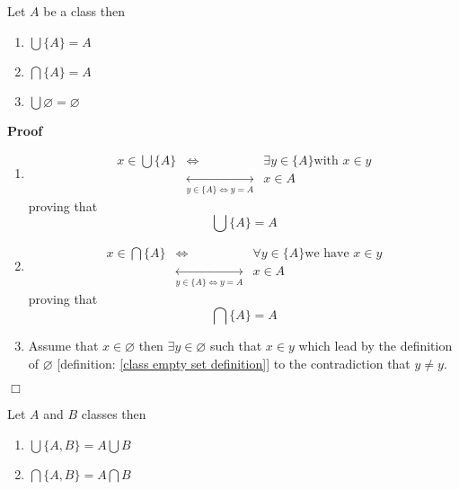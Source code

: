\documentclass{book}
\newcommand{\Leftrightarrowlim}{\mathop{\leftrightarrow}\limits}
\newenvironment{proof}{\noindent\textbf{Proof\ }}{\hspace*{\fill}$\Box$\medskip}
\begin{document}
\begin{example}
  \label{class trivial union intersection}Let $A$ be a class then
  \begin{enumerate}
    \item $\bigcup \{ A \} = A$
    
    \item $\bigcap \{ A \} = A$
    
    \item $\bigcup \varnothing = \varnothing$
  \end{enumerate}
\end{example}

\begin{proof}
  
  \begin{enumerate}
    \item 
    \begin{eqnarray*}
      x \in \bigcup \{ A \} & \Leftrightarrow & \exists y \in \{ A \} \text{
      with } x \in y\\
      & \Leftrightarrowlim_{y \in \{ A \} \Leftrightarrow y = A} & x \in A
    \end{eqnarray*}
    proving that
    \[ \bigcup \{ A \} = A \]
    \item 
    \begin{eqnarray*}
      x \in \bigcap \{ A \} & \Leftrightarrow & \forall y \in \{ A \} \text{
      we have } x \in y\\
      & \Leftrightarrowlim_{y \in \{ A \} \Leftrightarrow y = A} & x \in A
    \end{eqnarray*}
    proving that
    \[ \bigcap \{ A \} = A \]
    \item Assume that $x \in \varnothing$ then $\exists y \in \varnothing$
    such that $x \in y$ which lead by the definition of $\varnothing$
    [definition: \ref{class empty set definition}] to the contradiction that
    $y \neq y$.
  \end{enumerate}
\end{proof}

\begin{example}
  \label{class union{A,B}}Let $A$ and $B$ classes then
  \begin{enumerate}
    \item $\bigcup \{ A, B \} = A \bigcup B$
    
    \item $\bigcap \{ A, B \} = A \bigcap B$
  \end{enumerate}
\end{example}
\end{document}
